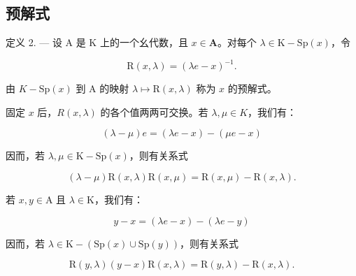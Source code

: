 \subsection{预解式}

定义 2. --- 设 A 是 K 上的一个幺代数，且 \(x \in \mathbf{A}\)。对每个 \(\lambda \in \mathrm{K} - \mathrm{Sp}(x)\)，令

\[
\mathrm{R} (x, \lambda) = (\lambda e - x) ^ {- 1}.
\]

由 \(K-\mathrm{Sp}(x)\) 到 A 的映射 \(\lambda\mapsto\mathrm{R}(x,\lambda)\) 称为 \(x\) 的预解式。

固定 \(x\) 后，\(R(x, \lambda)\) 的各个值两两可交换。若 \(\lambda, \mu \in K\)，我们有：

\[
(\lambda - \mu) e = (\lambda e - x) - (\mu e - x)
\]

因而，若 \(\lambda, \mu \in \mathrm{K} - \mathrm{Sp}(x)\)，则有关系式

\[
(\lambda - \mu) \mathrm{R} (x, \lambda) \mathrm{R} (x, \mu) = \mathrm{R} (x, \mu) - \mathrm{R} (x, \lambda).\tag{1}
\]

若 \(x,y\in \mathrm{A}\) 且 \(\lambda \in \mathrm{K}\)，我们有：

\[
y - x = (\lambda e - x) - (\lambda e - y)
\]

因而，若 \(\lambda\in\mathrm{K}-(\mathrm{Sp}(x)\cup\mathrm{Sp}(y))\)，则有关系式

\[
\mathrm{R} (y, \lambda) (y - x) \mathrm{R} (x, \lambda) = \mathrm{R} (y, \lambda) - \mathrm{R} (x, \lambda).\tag{2}
\]

